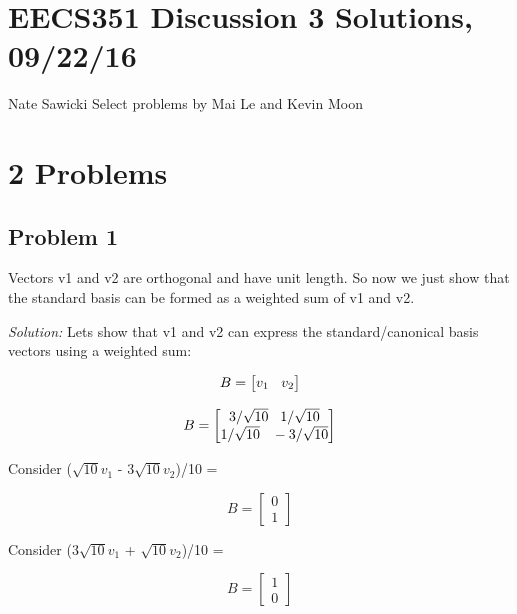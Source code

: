 \documentclass[11pt]{article}
\begin{document}
\section*{EECS351 Discussion 3 Solutions, 09/22/16}
Nate Sawicki \newline
Select problems by Mai Le and Kevin Moon

\section*{2 Problems}
\subsection*{Problem 1}
Vectors v1 and v2 are orthogonal and have unit length. So now we just show that the standard basis can be formed as a weighted sum of v1 and v2.

\vspace{4mm}
\emph{Solution:}
Lets show that v1 and v2 can express the standard/canonical basis vectors using a weighted sum:
\begin{center}
\[
B = 
\begin{bmatrix}
   v_1  \hspace{3mm}  v_2 
\end{bmatrix}
\]
\end{center}

\begin{center}
\[
B = 
\begin{bmatrix}
   3/\sqrt{10} \hspace{3mm}   1/\sqrt{10} \\
   1/\sqrt{10} \hspace{3mm}   -3/\sqrt{10}           
\end{bmatrix}
\]
\end{center}

\vspace{4mm}

Consider ($\sqrt{10}v_1$ - 3$\sqrt{10}v_2$)/10 =

\begin{center}
\[
B = 
\begin{bmatrix}
   0 \\
 1
\end{bmatrix}
\]
\end{center}


\vspace{4mm}

Consider (3$\sqrt{10}v_1$ + $\sqrt{10}v_2$)/10 =

\begin{center}
\[
B = 
\begin{bmatrix}
   1 \\
 0
\end{bmatrix}
\]
\end{center}
\end{document}
